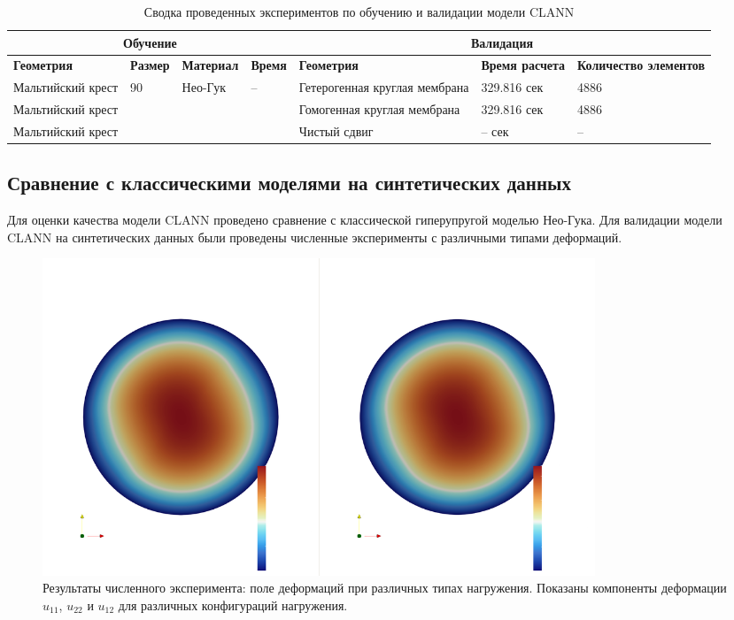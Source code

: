 \begin{table}[htbp]
\centering
\caption{Сводка проведенных экспериментов по обучению и валидации модели CLANN}
\label{tab:experiments_summary}
\begin{tabular}{|p{2.3cm}|p{2.2cm}|p{2.2cm}|p{1.3cm}|p{2.3cm}|p{1.5cm}|p{2.5cm}|}
\hline
\multicolumn{4}{|c|}{\textbf{Обучение}} & \multicolumn{3}{c|}{\textbf{Валидация}} \\
\hline
\textbf{Геометрия} & \textbf{Размер} & \textbf{Материал} & \textbf{Время} & \textbf{Геометрия} & \textbf{Время расчета} & \textbf{Количество элементов} \\
\hline
Мальтийский крест & 90 & Нео-Гук & -- & Гетерогенная круглая мембрана  & 329.816 сек & 4886 \\
\hline
Мальтийский крест & & & & Гомогенная круглая мембрана  & 329.816 сек & 4886  \\
\hline
Мальтийский крест & & & & Чистый сдвиг & -- сек & -- \\
\hline
\end{tabular}
\end{table}

\subsection{Сравнение с классическими моделями на синтетических данных}
Для оценки качества модели CLANN проведено сравнение с классической гиперупругой моделью Нео-Гука.
Для валидации модели CLANN на синтетических данных были проведены численные эксперименты с различными типами деформаций. 

\begin{figure}[htbp]
\centering
\includegraphics[width=0.8\textwidth]{img/bx_inf_u.png}
\caption{Результаты численного эксперимента: поле деформаций при различных типах нагружения. Показаны компоненты деформации $u_{11}$, $u_{22}$ и $u_{12}$ для различных конфигураций нагружения.}
\label{fig:numerical_deformations}
\end{figure}

